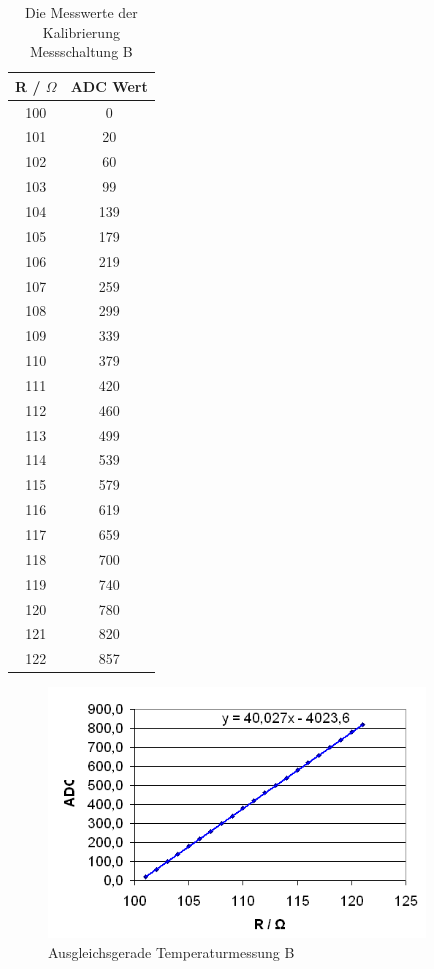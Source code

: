 \documentclass[a4paper,bibtotoc,oneside]{scrbook}
\begin{document}
\begin{table}[htbp]
\centering
\begin{tabular}{ | c | c | }\hline
{\bf R / $\Omega$ } & {\bf ADC Wert}\\ \hline
\hline
100 & 0\\ \hline
101 & 20\\ \hline
102 & 60\\ \hline
103 & 99\\ \hline
104 & 139\\ \hline
105 & 179\\ \hline
106 & 219\\ \hline
107 & 259\\ \hline
108 & 299\\ \hline
109 & 339\\ \hline
110 & 379\\ \hline
111 & 420\\ \hline
112 & 460\\ \hline
113 & 499\\ \hline
114 & 539\\ \hline
115 & 579\\ \hline
116 & 619\\ \hline
117 & 659\\ \hline
118 & 700\\ \hline
119 & 740\\ \hline
120 & 780\\ \hline
121 & 820\\ \hline
122 & 857\\ \hline
\end{tabular}
\caption{Die Messwerte der Kalibrierung Messschaltung B}\label{TabB}
\end{table}

\begin{figure}[htbp]
\centering
\includegraphics[width=100mm]{img/messb.png}
\caption{Ausgleichsgerade Temperaturmessung B}\label{messb}
\end{figure}
\end{document}
